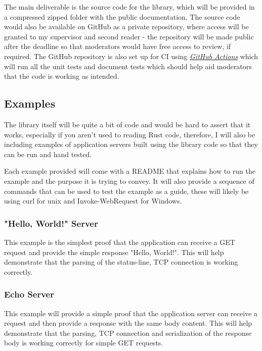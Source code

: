 \documentclass[12pt, a4paper]{article}
\begin{document}
The main deliverable is the source code for the library, which will be provided in a compressed zipped
folder with the public documentation. The source code would also be available on GitHub as a private
repository, where access will be granted to my supervisor and second reader - the repository will
be made public after the deadline so that moderators would have free access to review, if required.
The GitHub repository is also set up for CI using
\href{https://docs.github.com/en/actions/learn-github-actions/understanding-github-actions}{\emph{GitHub Actions}}
which will run all the unit tests and document tests which should help aid moderators that the code
is working as intended.

\subsection{Examples}

The library itself will be quite a bit of code and would be hard to assert that it works, especially
if you aren't used to reading Rust code, therefore, I will also be including examples of application
servers built using the library code so that they can be run and hand tested.

Each example provided will come with a README that explains how to run the example
and the purpose it is trying to convey. It will also provide a sequence of commands that can be
used to test the example as a guide, these will likely be using curl for unix and Invoke-WebRequest
for Windows.

\subsubsection{"Hello, World!" Server}
This example is the simplest proof that the application can receive a GET request and provide the
simple response "Hello, World!". This will help demonstrate that the parsing of the status-line,
TCP connection is working correctly.

\subsubsection{Echo Server}

This example will provide a simple proof that the application server can receive a request and then
provide a response with the same body content. This will help demonstrate that the parsing, TCP
connection and serialization of the response body is working correctly for simple GET requests.
\end{document}
